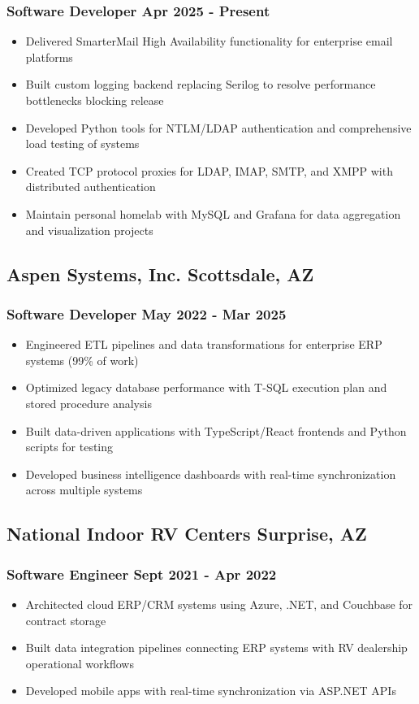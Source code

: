 \documentclass[11pt]{article} %
\begin{document}
\subsubsection{Software Developer \hfill Apr 2025 - Present}
\begin{itemize}
    \item Delivered SmarterMail High Availability functionality for enterprise email platforms
    \item Built custom logging backend replacing Serilog to resolve performance bottlenecks blocking release
    \item Developed Python tools for NTLM/LDAP authentication and comprehensive load testing of systems
    \item Created TCP protocol proxies for LDAP, IMAP, SMTP, and XMPP with distributed authentication
    \item Maintain personal homelab with MySQL and Grafana for data aggregation and visualization projects
\end{itemize}

\subsection*{Aspen Systems, Inc. \hfill Scottsdale, AZ}
\subsubsection{Software Developer \hfill May 2022 - Mar 2025}
\begin{itemize}
    \item Engineered ETL pipelines and data transformations for enterprise ERP systems (99\% of work)
    \item Optimized legacy database performance with T-SQL execution plan and stored procedure analysis
    \item Built data-driven applications with TypeScript/React frontends and Python scripts for testing
    \item Developed business intelligence dashboards with real-time synchronization across multiple systems
\end{itemize}

\subsection{National Indoor RV Centers \hfill Surprise, AZ}
\subsubsection{Software Engineer \hfill Sept 2021 - Apr 2022}
\begin{itemize}
	\item Architected cloud ERP/CRM systems using Azure, .NET, and Couchbase for contract storage
	\item Built data integration pipelines connecting ERP systems with RV dealership operational workflows
	\item Developed mobile apps with real-time synchronization via ASP.NET APIs
	\end{itemize}
\end{document}
